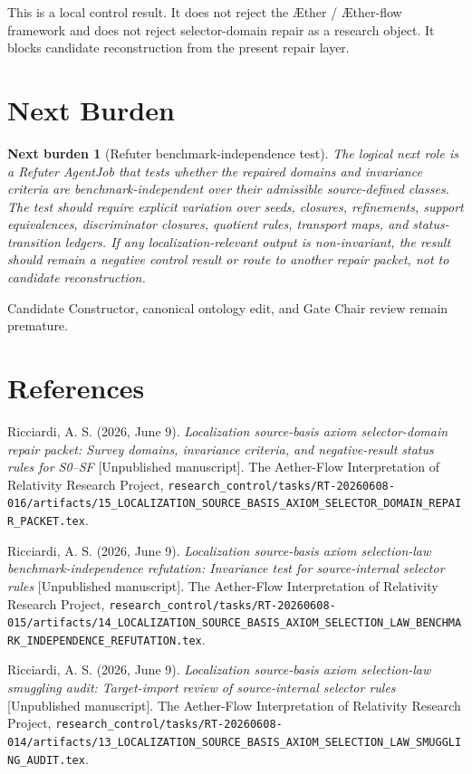 \documentclass[11pt]{article}
\newcommand{\Aether}{\AE{}ther}
\newcommand{\Aflow}{\AE{}ther-flow}
\newcommand{\TheoryProgram}{\Aether{} / \Aflow{} framework}
\newtheorem{nextburden}{Next burden}
\begin{document}
This is a local control result. It does not reject the \TheoryProgram{} and
does not reject selector-domain repair as a research object. It blocks
candidate reconstruction from the present repair layer.

\section{Next Burden}

\begin{nextburden}[Refuter benchmark-independence test]
The logical next role is a Refuter AgentJob that tests whether the repaired
domains and invariance criteria are benchmark-independent over their
admissible source-defined classes. The test should require explicit variation
over seeds, closures, refinements, support equivalences, discriminator
closures, quotient rules, transport maps, and status-transition ledgers. If
any localization-relevant output is non-invariant, the result should remain a
negative control result or route to another repair packet, not to candidate
reconstruction.
\end{nextburden}

Candidate Constructor, canonical ontology edit, and Gate Chair review remain
premature.

\section*{References}

Ricciardi, A. S. (2026, June 9). \emph{Localization source-basis axiom
selector-domain repair packet: Survey domains, invariance criteria, and
negative-result status rules for S0--SF} [Unpublished manuscript]. The
Aether-Flow Interpretation of Relativity Research Project,
\texttt{research\_control/tasks/RT-20260608-016/artifacts/15\_LOCALIZATION\_SOURCE\_BASIS\_AXIOM\_SELECTOR\_DOMAIN\_REPAIR\_PACKET.tex}.

Ricciardi, A. S. (2026, June 9). \emph{Localization source-basis axiom
selection-law benchmark-independence refutation: Invariance test for
source-internal selector rules} [Unpublished manuscript]. The Aether-Flow
Interpretation of Relativity Research Project,
\texttt{research\_control/tasks/RT-20260608-015/artifacts/14\_LOCALIZATION\_SOURCE\_BASIS\_AXIOM\_SELECTION\_LAW\_BENCHMARK\_INDEPENDENCE\_REFUTATION.tex}.

Ricciardi, A. S. (2026, June 9). \emph{Localization source-basis axiom
selection-law smuggling audit: Target-import review of source-internal
selector rules} [Unpublished manuscript]. The Aether-Flow Interpretation of
Relativity Research Project,
\texttt{research\_control/tasks/RT-20260608-014/artifacts/13\_LOCALIZATION\_SOURCE\_BASIS\_AXIOM\_SELECTION\_LAW\_SMUGGLING\_AUDIT.tex}.
\end{document}
